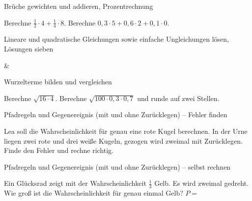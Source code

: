 \begin{aufgabe}{Brüche gewichten und addieren, Prozentrechnung}
\begin{teile}
\teil Berechne $\frac{1}{2} \cdot 4 + \frac{1}{4} \cdot 8$.
\teil Berechne $0{,}3 \cdot 5 + 0{,}6 \cdot 2 + 0{,}1 \cdot 0$.
\end{teile}
\end{aufgabe}

\begin{aufgabe}{Lineare und quadratische Gleichungen sowie einfache Ungleichungen lösen, Lösungen sieben}
\begin{gleichungsraster}[2]
 &
 \\
\end{gleichungsraster}
\end{aufgabe}

\begin{aufgabe}{Wurzelterme bilden und vergleichen}
\begin{teile}
\teil Berechne $\sqrt{16 \cdot 4}$.
\teil Berechne $\sqrt{100 \cdot 0{,}3 \cdot 0{,}7}$ und runde auf zwei Stellen.
\end{teile}
\end{aufgabe}

\begin{aufgabe}{Pfadregeln und Gegenereignis (mit und ohne Zurücklegen) – Fehler finden}
\begin{teile}
\teil Lea soll die Wahrscheinlichkeit für genau eine rote Kugel berechnen. In der Urne liegen zwei rote und drei weiße Kugeln, gezogen wird zweimal mit Zurücklegen. Finde den Fehler und rechne richtig. 
\end{teile}
\end{aufgabe}

\begin{aufgabe}{Pfadregeln und Gegenereignis (mit und ohne Zurücklegen) – selbst rechnen}
\begin{teile}
\teil Ein Glücksrad zeigt mit der Wahrscheinlichkeit $\frac{1}{3}$ Gelb. Es wird zweimal gedreht. Wie groß ist die Wahrscheinlichkeit für genau einmal Gelb? $P = $ \leerfeld
\end{teile}
\end{aufgabe}
